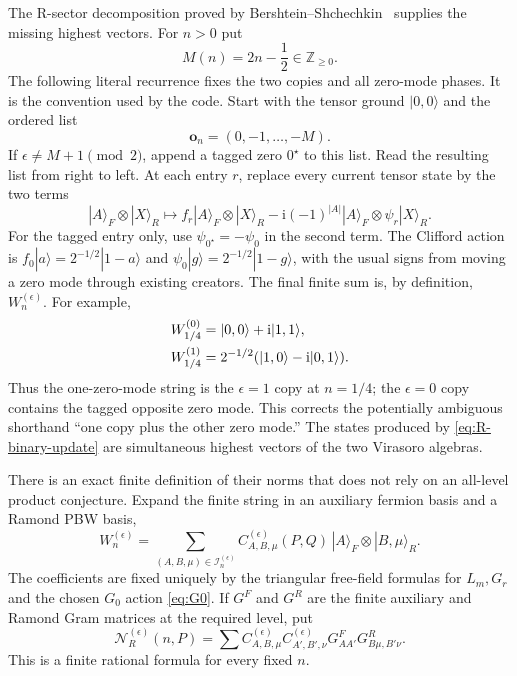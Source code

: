 \documentclass[11pt]{article}
\newcommand{\eps}{\epsilon}
\newcommand{\ii}{\mathrm i}
\begin{document}
The R-sector decomposition proved by Bershtein--Shchechkin~\cite{BS} supplies the
missing highest vectors.  For $n>0$ put
\begin{equation}
 M(n)=2n-\frac12\in\mathbb Z_{\geq0}.
 \label{eq:Mdef}
\end{equation}
The following literal recurrence fixes the two copies and all zero-mode
phases.  It is the convention used by the code.  Start with the tensor
ground $|0,0\rangle$ and the ordered list
\begin{equation}
 \mathbf o_n=(0,-1,\ldots,-M).
 \label{eq:R-operator-list}
\end{equation}
If $\eps\ne M+1\pmod2$, append a tagged zero $0^\star$ to this list.  Read
the resulting list from right to left.  At each entry $r$, replace every
current tensor state by the two terms
\begin{equation}
 |A\rangle_F\otimes|X\rangle_R\longmapsto
 f_r|A\rangle_F\otimes|X\rangle_R
 -\ii(-1)^{|A|}|A\rangle_F\otimes\psi_r|X\rangle_R.
 \label{eq:R-binary-update}
\end{equation}
For the tagged entry only, use $\psi_{0^\star}=-\psi_0$ in the second
term.  The Clifford action is
$f_0|a\rangle=2^{-1/2}|1-a\rangle$ and
$\psi_0|g\rangle=2^{-1/2}|1-g\rangle$, with the usual signs from moving a
zero mode through existing creators.  The final finite sum is, by
definition, $W_n^{(\eps)}$.  For example,
\begin{align}
 W_{1/4}^{(0)}&=|0,0\rangle+\ii|1,1\rangle,\notag\\
 W_{1/4}^{(1)}&=2^{-1/2}(|1,0\rangle-\ii|0,1\rangle).
 \label{eq:R-ground-branches}
\end{align}
Thus the one-zero-mode string is the $\eps=1$ copy at $n=1/4$; the
$\eps=0$ copy contains the tagged opposite zero mode.  This corrects the
potentially ambiguous shorthand ``one copy plus the other zero mode.''
The states produced by \eqref{eq:R-binary-update} are simultaneous highest
vectors of the two Virasoro algebras.

There is an exact finite definition of their norms that does not rely on an
all-level product conjecture.  Expand the finite string in an auxiliary
fermion basis and a Ramond PBW basis,
\begin{equation}
 W_n^{(\eps)}=\sum_{(A,B,\mu)\in\mathcal I_n^{(\eps)}}
 C_{A,B,\mu}^{(\eps)}(P,Q)\,|A\rangle_F\otimes|B,\mu\rangle_R.
 \label{eq:R-PBW-expansion}
\end{equation}
The coefficients are fixed uniquely by the triangular free-field formulas
for $L_m,G_r$ and the chosen $G_0$ action \eqref{eq:G0}.  If $G^F$ and $G^R$
are the finite auxiliary and Ramond Gram matrices at the required level, put
\begin{equation}
 \mathcal N_R^{(\eps)}(n,P)=
 \sum C_{A,B,\mu}^{(\eps)}C_{A',B',\nu}^{(\eps)}
 G^F_{AA'}G^R_{B\mu,B'\nu}.
 \label{eq:R-exact-norm}
\end{equation}
This is a finite rational formula for every fixed $n$.
\end{document}
